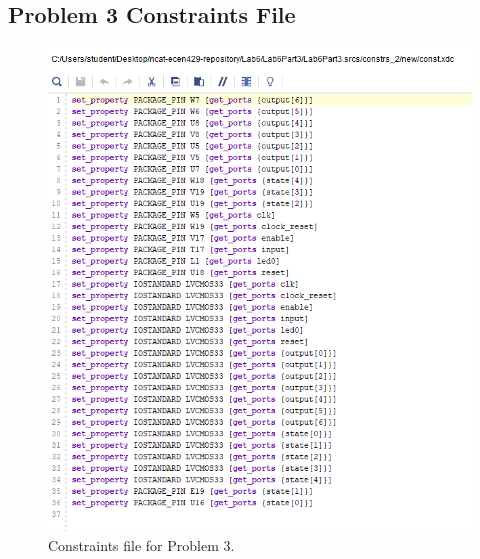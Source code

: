 \documentclass[11pt]{article}
\begin{document}
\begin{appendices}
\section{Problem 3 Constraints File}
\begin{center}
\begin{figure}[H]
	\includegraphics[scale=1]{./images/Lab6Part3Const.png}
	\caption{\label{fig:Prob1Const}Constraints file for Problem 3.}
\end{figure}
\end{center}

\end{appendices}
\end{document}
